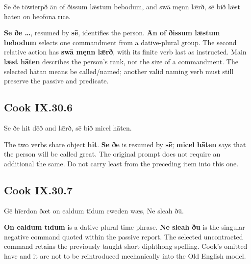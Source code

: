\par\begin{minipage}{\linewidth}\raggedright
Se ðe tōwierpð ān of ðissum lǣstum bebodum, and swā męnn lǣrð, sē bið lǣst hāten on heofona rīce.

\textbf{Se ðe …}, resumed by \textbf{sē}, identifies the person. \textbf{Ān of ðissum lǣstum bebodum} selects one commandment from a dative-plural group. The second relative action has \textbf{swā męnn lǣrð}, with its finite verb last as instructed. Main \textbf{lǣst hāten} describes the person’s rank, not the size of a commandment. The selected hātan means be called/\allowbreak{}named; another valid naming verb must still preserve the passive and predicate.

\end{minipage}\par\addvspace{4pt}

\subsection*{Cook IX.30.6}

\par\begin{minipage}{\linewidth}\raggedright
Se ðe hit dēð and lǣrð, sē bið micel hāten.

The two verbs share object \textbf{hit}. \textbf{Se ðe} is resumed by \textbf{sē}; \textbf{micel hāten} says that the person will be called great. The original prompt does not require an additional the same. Do not carry least from the preceding item into this one.

\end{minipage}\par\addvspace{4pt}

\subsection*{Cook IX.30.7}

\par\begin{minipage}{\linewidth}\raggedright
Gē hīerdon ðæt on ealdum tīdum cweden wæs, Ne sleah ðū.

\textbf{On ealdum tīdum} is a dative plural time phrase. \textbf{Ne sleah ðū} is the singular negative command quoted within the passive report. The selected uncontracted command retains the previously taught short diphthong spelling. Cook’s omitted have and it are not to be reintroduced mechanically into the Old English model.

\end{minipage}\par\addvspace{4pt}

